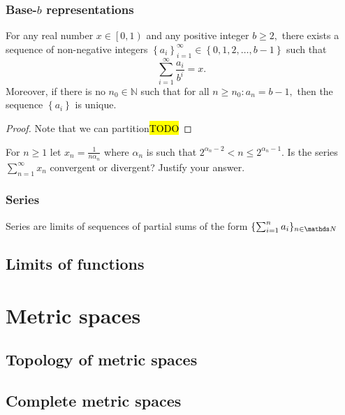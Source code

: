 \subsubsection{\label{subsec:baseBRepresentations}Base-$b$ representations}
\begin{thm}
\label{thm:realDecimalExpansion}For any real number $x\in\left[0,1\right)$
and any positive integer $b\geq2,$ there exists a sequence of non-negative
integers $\left\{ a_{i}\right\} _{i=1}^{\infty}\in\left\{ 0,1,2,\ldots,b-1\right\} $
such that 
\[
\sum_{i=1}^{\infty}\frac{a_{i}}{b^{i}}=x.
\]
Moreover, if there is no $n_{0}\in\mathbb{N}$ such that for all $n\geq n_{0}:a_{n}=b-1,$
then the sequence $\left\{ a_{i}\right\} $ is unique.
\end{thm}

\begin{proof}
Note that we can partition\hl{TODO}
\end{proof}
\begin{example}
\label{exa:isi2004samplepsb11}For $n\geq1$ let $x_{n}=\frac{1}{n\alpha_{n}}$
where $\alpha_{n}$ is such that $2^{\alpha_{n}-2}<n\leq2^{\alpha_{n}-1}$.
Is the series $\sum_{n=1}^{\infty}x_{n}$ convergent or divergent?
Justify your answer.
\end{example}

\subsubsection{Series}

Series are limits of sequences of partial sums of the form $\{\sum_{i=1}^n a_i \}_{n\in\N}$


\subsection{Limits of functions}



\section{Metric spaces}

\subsection{Topology of metric spaces}

\subsection{Complete metric spaces}

